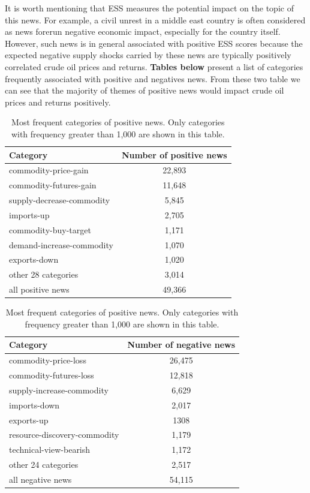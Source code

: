 \documentclass[12pt]{article}
\begin{document}
	\par It is worth mentioning that ESS measures the potential impact on the topic of this news. For example, a civil unrest in a middle east country is often considered as news forerun negative economic impact, especially for the country itself.
	However, such news is in general associated with positive ESS scores because the expected negative supply shocks carried by these news are typically positively correlated crude oil prices and returns. \textbf{Tables below} present a list of categories frequently associated with positive and negatives news. From these two table we can see that the majority of themes of positive news would impact crude oil prices and returns positively.
	\begin{table}[H]
		\centering
		\small
		\begin{tabular}{l|c}
			\toprule
			Category & Number of positive news \\
			\midrule
			commodity-price-gain & 22,893 \\
			commodity-futures-gain & 11,648 \\
			supply-decrease-commodity & 5,845 \\
			imports-up & 2,705 \\
			commodity-buy-target & 1,171 \\
			demand-increase-commodity & 1,070 \\
			exports-down & 1,020 \\
			other 28 categories & 3,014 \\
			\midrule
			all positive news & 49,366 \\
			\bottomrule
		\end{tabular}
		\caption{Most frequent categories of positive news. Only categories with frequency greater than 1,000 are shown in this table.}
	\end{table}

	\begin{table}[H]
		\centering
		\small
		\begin{tabular}{l|c}
			\toprule
			Category & Number of negative news \\
			\midrule
			commodity-price-loss & 26,475 \\
			commodity-futures-loss & 12,818 \\
			supply-increase-commodity & 6,629 \\
			imports-down & 2,017 \\
			exports-up & 1308 \\
			resource-discovery-commodity & 1,179 \\
			technical-view-bearish & 1,172 \\
			other 24 categories & 2,517 \\
			\midrule
			all negative news & 54,115 \\
			\bottomrule
		\end{tabular}
		\caption{Most frequent categories of positive news. Only categories with frequency greater than 1,000 are shown in this table.}
	\end{table}
\end{document}
